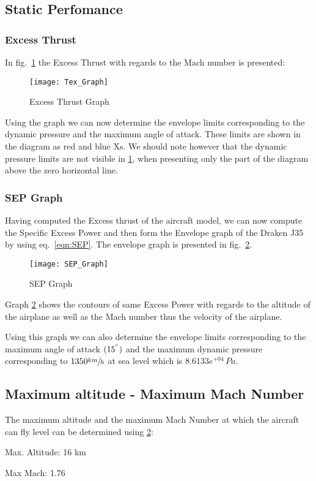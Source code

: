 \subsection{Static Perfomance}

\subsubsection{Excess Thrust}

In fig.~\ref{fig:Tex_Graph} the Excess Thrust with regards to the Mach number is presented:

\begin{figure}[H]
    \centering
    \texttt{[image: Tex\_Graph]}
    \caption{Excess Thrust Graph}
    \label{fig:Tex_Graph}
\end{figure}

Using the graph we can now determine the envelope limits corresponding to the dynamic pressure and the 
maximum angle of attack. These limits are shown in the diagram as red and blue Xs.
We should note however that the dynamic pressure limits are not visible in  \ref{fig:Tex_Graph}, when presenting 
only the part of the diagram above the zero horizontal line.

\subsubsection{SEP Graph}

\noindent Having computed the Excess thrust of the aircraft model, we can now 
compute the Specific Excess Power and then form the Envelope graph of the Draken J35 by using
eq.~\ref{eqn:SEP}. The envelope graph is presented in fig.~\ref{fig:SEP_Graph}.

\begin{figure}[H]
    \centering
    \texttt{[image: SEP\_Graph]}
    \caption{SEP Graph}
    \label{fig:SEP_Graph}
\end{figure}

\noindent Graph \ref{fig:SEP_Graph} shows the contours of same Excess Power with regards to
the altitude of the airplane as well as the Mach number thus the velocity of the airplane.

Using this graph we can also determine the envelope limits corresponding to the maximum angle of attack
$(15^{\degree})$ and the maximum dynamic pressure corresponding to $1350 \sfrac{km}{h}$ at sea level which 
is $8.6133e^{+04}\, Pa$.

\subsection{Maximum altitude - Maximum Mach Number}
The maximum altitude and the maximum Mach Number at which the aircraft can fly level 
can be determined using \ref{fig:SEP_Graph}:

\begin{itemize*}
    \item Max. Altitude: 16 km
    \item Max Mach: 1.76
\end{itemize*}
